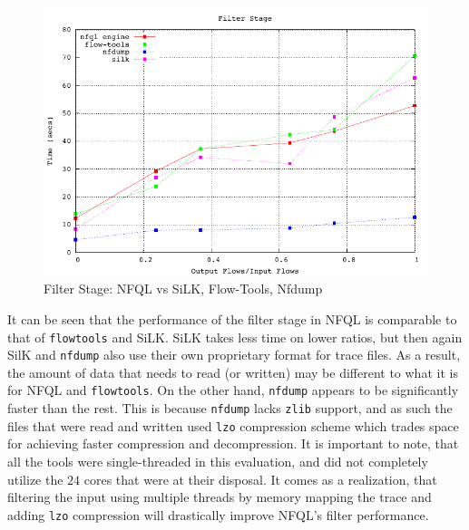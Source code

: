 \begin{figure}[h!]
  \begin{center}
    \includegraphics* [width=0.8\linewidth]{figures/benchmarks/filter}
    \caption{Filter Stage: NFQL vs SiLK, Flow-Tools, Nfdump}
    \label{fig:benchmarks-filter}
  \end{center}
\end{figure}

It can be seen that the performance of the filter stage in \ac{NFQL} is
comparable to that of \texttt{flowtools} and SiLK. SiLK takes less time on
lower ratios, but then again SilK and \texttt{nfdump} also use their own
proprietary format for trace files. As a result, the amount of data that needs
to read (or written) may be different to what it is for \ac{NFQL} and
\texttt{flowtools}. On the other hand, \texttt{nfdump} appears to be
significantly faster than the rest. This  is because \texttt{nfdump} lacks \texttt{zlib} support, and as
such the files that were read and written used \texttt{lzo} compression scheme
which trades space for achieving faster compression and decompression. It is
important to note, that all the tools were single-threaded in this evaluation,
and did not completely utilize the $24$ cores that were at their disposal. It
comes as a realization, that filtering the input using multiple threads by
memory mapping the trace and adding \texttt{lzo} compression will drastically
improve \ac{NFQL}'s filter performance.

